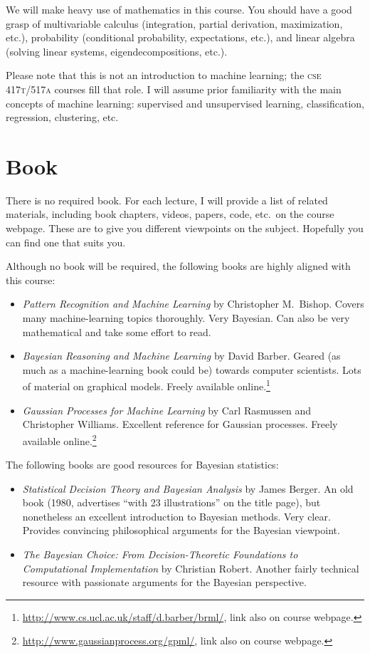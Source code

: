 \documentclass{article}
\newcommand{\acro}[1]{\textsc{\MakeLowercase{#1}}}
\begin{document}
We will make heavy use of mathematics in this course.  You should have a good
grasp of multivariable calculus (integration, partial derivation, maximization,
etc.), probability (conditional probability, expectations, etc.), and linear
algebra (solving linear systems, eigendecompositions, etc.).

Please note that this is not an introduction to machine learning; the \acro{CSE
  417T/517A} courses fill that role.  I will assume prior familiarity with the
main concepts of machine learning: supervised and unsupervised learning,
classification, regression, clustering, etc.

\section*{Book}

There is no required book. For each lecture, I will provide a list of related
materials, including book chapters, videos, papers, code, etc.\ on the course
webpage.  These are to give you different viewpoints on the subject.  Hopefully
you can find one that suits you.

Although no book will be required, the following books are highly aligned with
this course:
\begin{itemize}
\item \emph{Pattern Recognition and Machine Learning} by Christopher M.\ Bishop.
  Covers many machine-learning topics thoroughly.  Very Bayesian.  Can also be
  very mathematical and take some effort to read.
\item \emph{Bayesian Reasoning and Machine Learning} by David Barber.  Geared
  (as much as a machine-learning book could be) towards computer scientists.
  Lots of material on graphical models.  Freely available
  online.\footnote{\url{http://www.cs.ucl.ac.uk/staff/d.barber/brml/}, link also
    on course webpage.}
\item \emph{Gaussian Processes for Machine Learning} by Carl Rasmussen and
  Christopher Williams.  Excellent reference for Gaussian processes.  Freely
  available online.\footnote{\url{http://www.gaussianprocess.org/gpml/}, link
    also on course webpage.}
\end{itemize}

The following books are good resources for Bayesian statistics:
\begin{itemize}
\item \emph{Statistical Decision Theory and Bayesian Analysis} by James Berger.
  An old book (1980, advertises ``with 23 illustrations'' on the title page),
  but nonetheless an excellent introduction to Bayesian methods.  Very clear.
  Provides convincing philosophical arguments for the Bayesian viewpoint.
\item \emph{The Bayesian Choice: From Decision-Theoretic Foundations to
  Computational Implementation} by Christian Robert.  Another fairly technical
  resource with passionate arguments for the Bayesian perspective.
\end{itemize}
\end{document}
